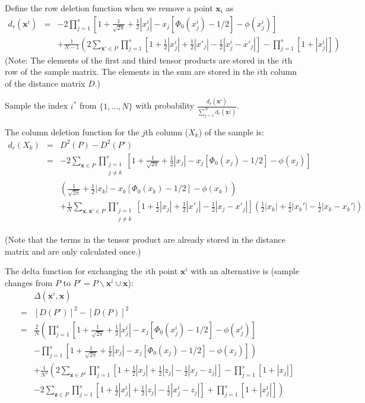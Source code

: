 \documentclass[12pt]{article}
\newcommand{\vx}{\boldsymbol{x}}
\newcommand{\vz}{\boldsymbol{z}}
\begin{document}
Define the row deletion function when we remove a point $\vx_i$ as
\begin{eqnarray}\label{eq:rowdelection}
d_r(\vx^i) &=& -2\prod\limits_{j=1}^s\left[ 1+\frac{1}{\sqrt{2\pi}}+\frac{1}{2}|x^i_{j}|-x_j[\Phi_0(x^i_{j})-1/2]-\phi(x^i_{j})\right]\\ \nonumber
  && + \frac{1}{N-1}\left(2\sum_{\vx'\in P}\prod_{j=1}^s \left[1+\frac{1}{2}|x^i_{j}|+\frac{1}{2}|x'_j|-\frac{1}{2}|x^i_{j}-x'_j|\right]-\prod_{j=1}^s\left[1+|x^i_{j}|\right]\right)
\end{eqnarray}
(Note: The elements of the first and third tensor products are stored in the $i$th row of the sample matrix. The elements in the sum are stored in the $i$th column of the distance matrix $D$.)

Sample the index $i^*$ from $\{1,...,N\}$ with probability $
\frac{d_r(\vx^i)}{\sum\limits_{j=1}^Nd_r(\vx^j)}$.

The column deletion function for the $j$th column ($X_k$) of the sample is:
\begin{eqnarray}
d_c(X_k) &=& D^2(P)-D^2(P') \nonumber\\
&=& -2\sum_{\vx\in P}\prod\limits_{\substack{j=1\\j\neq k}}^s\left[ 1+\frac{1}{\sqrt{2\pi}}+\frac{1}{2}|x_{j}|-x_j[\Phi_0(x_{j})-1/2]-\phi(x_{j})\right]\nonumber\\ 
&&\left(\frac{1}{\sqrt{2\pi}}+\frac{1}{2}|x_{k}|-x_k[\Phi_0(x_{k})-1/2]-\phi(x_{k})\right)\nonumber\\
&&+\frac{1}{N}\sum_{\vx,\vx'\in P}\prod_{\substack{j=1\\j\neq k}}^s \left[1+\frac{1}{2}|x_j|+\frac{1}{2}|x'_j|-\frac{1}{2}|x_j-x'_j|\right]\left(\frac{1}{2}|x_k|+\frac{1}{2}|x_k'|-\frac{1}{2}|x_k-x_k'|\right)
\end{eqnarray}

(Note that the terms in the tensor product are already stored in the distance matrix and are only calculated once.)

The delta function for exchanging the $i$th point $\vx^i$ with an alternative is (sample changes from $P$ to  $P' = P\backslash\vx^i\cup \vx$):
\begin{eqnarray*}
&&\Delta(\vx^i,\vx)\\
&=& [D(P')]^2-[D(P)]^2\\
&=& \frac{2}{N}\left(\prod\limits_{j=1}^s\left[ 1+\frac{1}{\sqrt{2\pi}}+\frac{1}{2}|x^i_{j}|-x_j[\Phi_0(x^i_{j})-1/2]-\phi(x^i_{j})\right]\right.\\
&&\left.-\prod\limits_{j=1}^s\left[ 1+\frac{1}{\sqrt{2\pi}}+\frac{1}{2}|x_{j}|-x_j[\Phi_0(x_{j})-1/2]-\phi(x_{j})\right]\right)\\
&&+\frac{1}{N^2}\left(2\sum_{\vz\in P'}\prod_{j=1}^s \left[1+\frac{1}{2}|x_{j}|+\frac{1}{2}|z_j|-\frac{1}{2}|x_{j}-z_j|\right]-\prod_{j=1}^s\left[1+|x_{j}|\right]\right.\\
&& - \left.2\sum_{\vz\in P}\prod_{j=1}^s \left[1+\frac{1}{2}|x^i_{j}|+\frac{1}{2}|z_j|-\frac{1}{2}|x^i_{j}-z_j|\right]+\prod_{j=1}^s\left[1+|x^i_{j}|\right]\right)
\end{eqnarray*}
\end{document}
